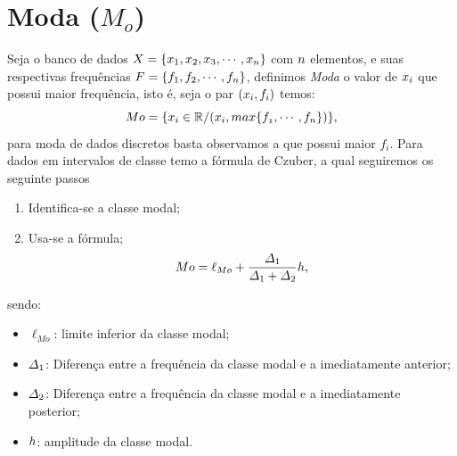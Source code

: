 \section{Moda ($M_o$)}
\inic Seja o banco de dados $\mathnormal{X}= \{\mathnormal{x}_1,\mathnormal{x}_2,\mathnormal{x}_3,\cdots, \mathnormal{x_n}\}$ com $\mathnormal{n}$ elementos, e suas respectivas frequências $\mathnormal{F}=\{\mathnormal{f}_1,\mathnormal{f}_2,\cdots,\mathnormal{f_n}\}$, definimos \textit{Moda} o valor de $\mathnormal{x_i}$ que possui maior frequência, isto é, seja o par $(\mathnormal{x_i,f_i})$ temos:
	\begin{equation*}
		Mo = \{\mathnormal{x_i} \in \mathbb{R}/ (\mathnormal{x_i}, max\{\mathnormal{f_1},\cdots,\mathnormal{f_n}\})\},
	\end{equation*}
para moda de dados discretos basta observamos a que possui maior $f_i$. Para dados em intervalos de classe temo a fórmula de Czuber, a qual seguiremos os seguinte passos
\begin{enumerate}
        \item[(i)] Identifica-se a classe modal;
		\item[(ii)] Usa-se a fórmula;
		\begin{equation}
		\label{Czuber}
		\mathnormal{Mo} = \ell_{Mo} + \frac{\mathnormal{\Delta}_1}{\mathnormal{\Delta}_1 + \mathnormal{\Delta}_2}\mathnormal{h},
		\end{equation}
	\end{enumerate}
	sendo:
	\begin{itemize}
		\item $\ell_{Mo}$: limite inferior da classe modal;
		\item $\mathnormal{\Delta}_1$: Diferença entre a frequência da classe modal e a imediatamente anterior;
		\item $\mathnormal{\Delta}_2$: Diferença entre a frequência da classe modal e a imediatamente posterior;
		\item $\mathnormal{h}$: amplitude da classe modal.
	\end{itemize}

